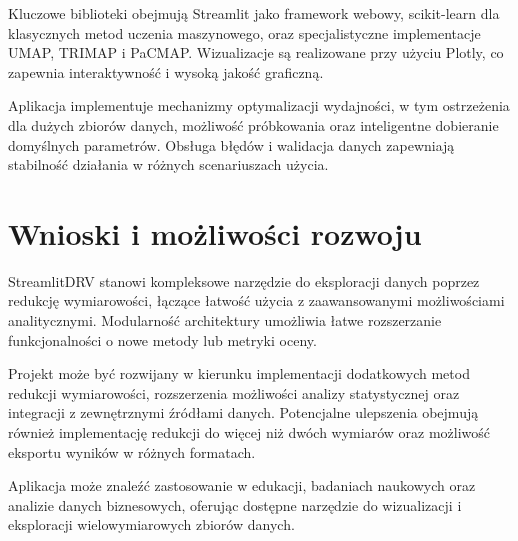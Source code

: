 \documentclass[a4paper, 12pt]{article}
\begin{document}
Kluczowe biblioteki obejmują Streamlit jako framework webowy, scikit-learn dla klasycznych metod uczenia maszynowego, oraz specjalistyczne implementacje UMAP, TRIMAP i PaCMAP. Wizualizacje są realizowane przy użyciu Plotly, co zapewnia interaktywność i wysoką jakość graficzną.

Aplikacja implementuje mechanizmy optymalizacji wydajności, w tym ostrzeżenia dla dużych zbiorów danych, możliwość próbkowania oraz inteligentne dobieranie domyślnych parametrów. Obsługa błędów i walidacja danych zapewniają stabilność działania w różnych scenariuszach użycia.

\section{Wnioski i możliwości rozwoju}

StreamlitDRV stanowi kompleksowe narzędzie do eksploracji danych poprzez redukcję wymiarowości, łączące łatwość użycia z zaawansowanymi możliwościami analitycznymi. Modularność architektury umożliwia łatwe rozszerzanie funkcjonalności o nowe metody lub metryki oceny.

Projekt może być rozwijany w kierunku implementacji dodatkowych metod redukcji wymiarowości, rozszerzenia możliwości analizy statystycznej oraz integracji z zewnętrznymi źródłami danych. Potencjalne ulepszenia obejmują również implementację redukcji do więcej niż dwóch wymiarów oraz możliwość eksportu wyników w różnych formatach.

Aplikacja może znaleźć zastosowanie w edukacji, badaniach naukowych oraz analizie danych biznesowych, oferując dostępne narzędzie do wizualizacji i eksploracji wielowymiarowych zbiorów danych.
\end{document}
